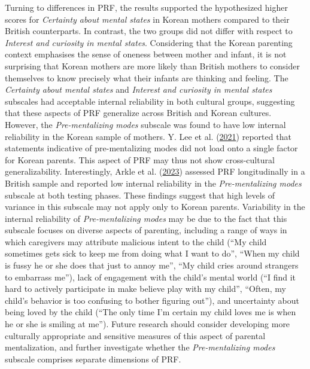 \documentclass[
]{article}
\begin{document}
Turning to differences in PRF, the results supported the hypothesized higher scores for \emph{Certainty about mental states} in Korean mothers compared to their British counterparts. In contrast, the two groups did not differ with respect to \emph{Interest and curiosity in mental states}. Considering that the Korean parenting context emphasises the sense of oneness between mother and infant, it is not surprising that Korean mothers are more likely than British mothers to consider themselves to know precisely what their infants are thinking and feeling. The \emph{Certainty about mental states} and \emph{Interest and curiosity in mental states} subscales had acceptable internal reliability in both cultural groups, suggesting that these aspects of PRF generalize across British and Korean cultures. However, the \emph{Pre-mentalizing modes} subscale was found to have low internal reliability in the Korean sample of mothers. Y. Lee et al. (\protect\hyperlink{ref-Lee2021}{2021}) reported that statements indicative of pre-mentalizing modes did not load onto a single factor for Korean parents. This aspect of PRF may thus not show cross-cultural generalizability. Interestingly, Arkle et al. (\protect\hyperlink{ref-Arkle2023}{2023}) assessed PRF longitudinally in a British sample and reported low internal reliability in the \emph{Pre-mentalizing modes} subscale at both testing phases. These findings suggest that high levels of variance in this subscale may not apply only to Korean parents. Variability in the internal reliability of \emph{Pre-mentalizing modes} may be due to the fact that this subscale focuses on diverse aspects of parenting, including a range of ways in which caregivers may attribute malicious intent to the child (``My child sometimes gets sick to keep me from doing what I want to do'', ``When my child is fussy he or she does that just to annoy me'', ``My child cries around strangers to embarrass me''), lack of engagement with the child's mental world (``I find it hard to actively participate in make believe play with my child'', ``Often, my child's behavior is too confusing to bother figuring out''), and uncertainty about being loved by the child (``The only time I'm certain my child loves me is when he or she is smiling at me''). Future research should consider developing more culturally appropriate and sensitive measures of this aspect of parental mentalization, and further investigate whether the \emph{Pre-mentalizing modes} subscale comprises separate dimensions of PRF.
\end{document}
